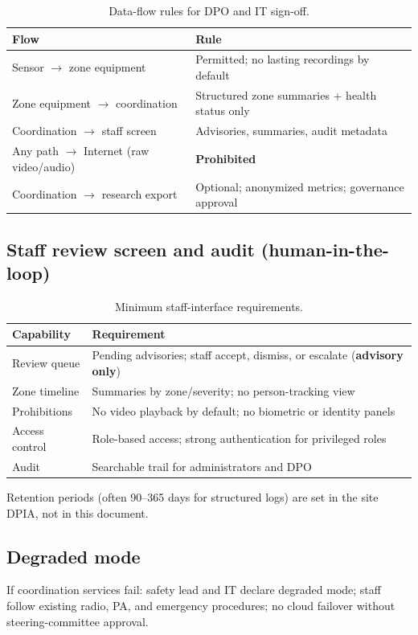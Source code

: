 \begin{table}[htbp]
  \centering
  \caption{Data-flow rules for DPO and IT sign-off.}
  \label{tab:data-flows}
  \small
  \begin{tabular}{@{}p{4.0cm}p{7.6cm}@{}}
    \toprule
    Flow & Rule \\
    \midrule
    Sensor $\rightarrow$ zone equipment & Permitted; no lasting recordings by default \\
    Zone equipment $\rightarrow$ coordination & Structured zone summaries + health status only \\
    Coordination $\rightarrow$ staff screen & Advisories, summaries, audit metadata \\
    Any path $\rightarrow$ Internet (raw video/audio) & \textbf{Prohibited} \\
    Coordination $\rightarrow$ research export & Optional; anonymized metrics; governance approval \\
    \bottomrule
  \end{tabular}
\end{table}

\subsection{Staff review screen and audit (human-in-the-loop)}

\begin{table}[htbp]
  \centering
  \caption{Minimum staff-interface requirements.}
  \label{tab:dashboard-req}
  \small
  \begin{tabular}{@{}p{2.8cm}p{8.2cm}@{}}
    \toprule
    Capability & Requirement \\
    \midrule
    Review queue & Pending advisories; staff accept, dismiss, or escalate (\textbf{advisory only}) \\
    Zone timeline & Summaries by zone/severity; no person-tracking view \\
    Prohibitions & No video playback by default; no biometric or identity panels \\
    Access control & Role-based access; strong authentication for privileged roles \\
    Audit & Searchable trail for administrators and DPO \\
    \bottomrule
  \end{tabular}
\end{table}

Retention periods (often 90--365 days for structured logs) are set in the site DPIA, not in this document.



\subsection{Degraded mode}

If coordination services fail: safety lead and IT declare degraded mode; staff follow existing
radio, PA, and emergency procedures; no cloud failover without steering-committee approval.
